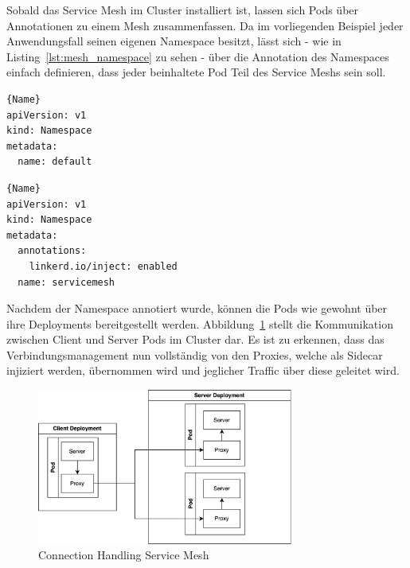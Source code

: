 Sobald das Service Mesh im Cluster installiert ist, lassen sich Pods über Annotationen zu einem Mesh zusammenfassen.
Da im vorliegenden Beispiel jeder Anwendungsfall seinen eigenen Namespace besitzt, lässt sich - wie in Listing~\ref{lst:mesh_namespace} zu sehen - über die Annotation des Namespaces einfach definieren, dass jeder beinhaltete Pod Teil des Service Meshs sein soll.

\begin{minipage}{.4\linewidth}
             \begin{lstlisting}[caption=Default Namespace,frame=tlrb,label={lst:default_namespace}]{Name}
apiVersion: v1
kind: Namespace
metadata:
  name: default
             \end{lstlisting}
\end{minipage}\hfill
\begin{minipage}{.49\linewidth}
             \begin{lstlisting}[caption=Service Mesh Namespace,frame=tlrb,label={lst:mesh_namespace}]{Name}
apiVersion: v1
kind: Namespace
metadata:
  annotations:
    linkerd.io/inject: enabled
  name: servicemesh
             \end{lstlisting}
\end{minipage}\hfill

Nachdem der Namespace annotiert wurde, können die Pods wie gewohnt über ihre Deployments bereitgestellt werden. Abbildung~\ref{fig:mesh_loadbalancing} stellt die Kommunikation zwischen Client und Server Pods im Cluster dar.
Es ist zu erkennen, dass das Verbindungsmanagement nun vollständig von den Proxies, welche als Sidecar injiziert werden, übernommen wird und jeglicher Traffic über diese geleitet wird.

\begin{figure}[H]
    \centering
    \includegraphics[width=0.75\textwidth]{img/mesh_loadbalancing}
    \caption{Connection Handling Service Mesh}
    \label{fig:mesh_loadbalancing}
\end{figure}


